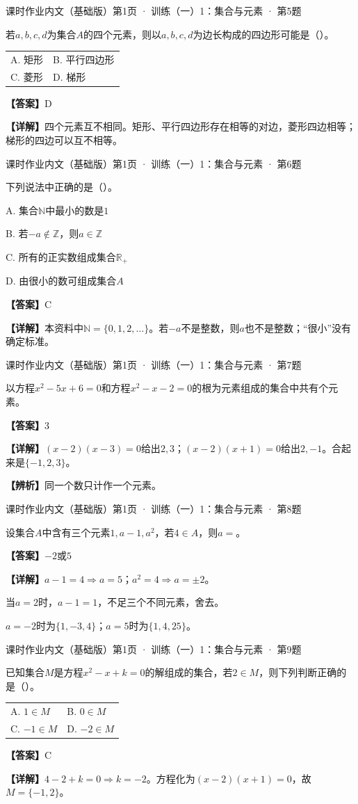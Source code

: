 \documentclass[UTF8,10pt,aspectratio=169]{ctexbeamer}
\makeatletter
\newcommand{\Answer}[1]{\par\vspace{0.2cm}\textbf{【答案】}#1}
\newcommand{\Analysis}[1]{\par\vspace{0.2cm}\textbf{【详解】}#1}
\newcommand{\Choices}[4]{\par\vspace{0.2cm}\begin{tabular}{@{}p{0.47\textwidth}p{0.47\textwidth}@{}}A. #1 & B. #2 \\[0.15cm] C. #3 & D. #4\end{tabular}}
\newcommand{\R}{\mathbb R}
\newcommand{\N}{\mathbb N}
\newcommand{\Z}{\mathbb Z}
\newcommand{\blank}{\underline{\hspace{1.6cm}}}
\newcommand{\Tip}[1]{\par\vspace{0.2cm}\textbf{【辨析】}#1}
\newcommand{\Source}[1]{{\scriptsize\color{gray}#1}\par\vspace{0.25cm}}
\makeatother
\begin{document}
\begin{frame}
\Source{课时作业内文（基础版）第1页 · 训练（一）1：集合与元素 · 第5题}
若$a,b,c,d$为集合$A$的四个元素，则以$a,b,c,d$为边长构成的四边形可能是（\quad）。
\Choices{矩形}{平行四边形}{菱形}{梯形}
\pause
\Answer{D}
\Analysis{四个元素互不相同。矩形、平行四边形存在相等的对边，菱形四边相等；梯形的四边可以互不相等。}
\end{frame}
\begin{frame}
\Source{课时作业内文（基础版）第1页 · 训练（一）1：集合与元素 · 第6题}
下列说法中正确的是（\quad）。
\par A. 集合$\N$中最小的数是$1$
\par B. 若$-a\notin\Z$，则$a\in\Z$
\par C. 所有的正实数组成集合$\R_+$
\par D. 由很小的数可组成集合$A$
\pause
\Answer{C}
\Analysis{本资料中$\N=\{0,1,2,\ldots\}$。若$-a$不是整数，则$a$也不是整数；“很小”没有确定标准。}
\end{frame}
\begin{frame}
\Source{课时作业内文（基础版）第1页 · 训练（一）1：集合与元素 · 第7题}
以方程$x^2-5x+6=0$和方程$x^2-x-2=0$的根为元素组成的集合中共有\blank 个元素。
\pause
\Answer{$3$}
\Analysis{$(x-2)(x-3)=0$给出$2,3$；$(x-2)(x+1)=0$给出$2,-1$。合起来是$\{-1,2,3\}$。}
\Tip{同一个数只计作一个元素。}
\end{frame}
\begin{frame}
\Source{课时作业内文（基础版）第1页 · 训练（一）1：集合与元素 · 第8题}
设集合$A$中含有三个元素$1,a-1,a^2$，若$4\in A$，则$a=$\blank。
\pause
\Answer{$-2$或$5$}
\Analysis{$a-1=4\Rightarrow a=5$；$a^2=4\Rightarrow a=\pm2$。
\par 当$a=2$时，$a-1=1$，不足三个不同元素，舍去。
\par $a=-2$时为$\{1,-3,4\}$；$a=5$时为$\{1,4,25\}$。}
\end{frame}
\begin{frame}
\Source{课时作业内文（基础版）第1页 · 训练（一）1：集合与元素 · 第9题}
已知集合$M$是方程$x^2-x+k=0$的解组成的集合，若$2\in M$，则下列判断正确的是（\quad）。
\Choices{$1\in M$}{$0\in M$}{$-1\in M$}{$-2\in M$}
\pause
\Answer{C}
\Analysis{$4-2+k=0\Rightarrow k=-2$。方程化为$(x-2)(x+1)=0$，故$M=\{-1,2\}$。}
\end{frame}
\end{document}
